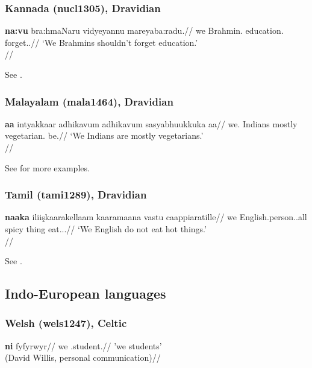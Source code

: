 \documentclass[A4paper]{article}
\begin{document}
\subsubsection{Kannada (nucl1305), Dravidian}

\ex \begingl
\gla \textbf{na:vu} bra:hmaNaru vidyeyannu mareyaba:radu.//
\glb we Brahmin.\Pl{} education.\Acc{} forget.\Inf.\Proh//
\glft `We Brahmins shouldn't forget education.'\\\citep[209, (755)]{sridhar1990}//
\endgl
\xe

See \citet[205, 208f.]{sridhar1990}.

\subsubsection{Malayalam (mala1464), Dravidian}

\ex \begingl
\gla \textbf{\textltailn{}a\ng\ng{}a\textrtaill{}} intyakkaar adhikavum adhikavum sasyabhuukkuka\textrtaill{} aa\textrtailn{}\textschwa{}//
\glb we.\Excl{} Indians mostly vegetarian.\Pl{} be.\Prs{}//
\glft `We Indians are mostly vegetarians.'\\\citep[262, (1340)]{asherkumari1997}//
\endgl
\xe 

See  \citealp[262f.]{asherkumari1997} for more examples.

\subsubsection{Tamil (tami1289), Dravidian}

\ex \begingl
\gla \textbf{naa\ng{}ka} i\ng{}lii\c{s}kaara\ng{}kellaam kaaramaana vastu caappi\textrtailt{}aratille//
\glb we English.person.\Pl.all spicy thing eat.\Prs.\Nom{}.\Neg//
\glft `We English do not eat hot things.'\\\citep[146]{asher1985}//
\endgl
\xe 

See \citet[142, 146]{asher1985}.

\subsection{Indo-European languages}


\subsubsection{Welsh (wels1247), Celtic}

\ex \begingl
\gla \textbf{ni} fyfyrwyr//
\glb we \Softmut.student.\Pl{}//
\glft 'we students'\\(David Willis, personal communication)//
\endgl
\xe
\end{document}
